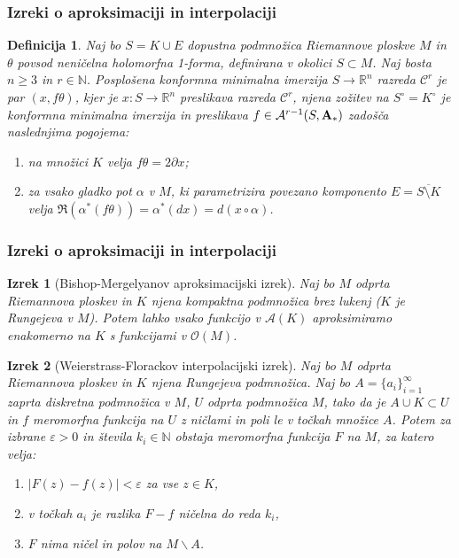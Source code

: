 \documentclass[9pt, table]{beamer}
\newtheorem{izrek}{Izrek}
\newtheorem{definicija}{Definicija}
\newcommand{\R}{\mathbb R}
\newcommand{\N}{\mathbb N}
\begin{document}

\begin{frame}
\frametitle{Izreki o aproksimaciji in interpolaciji}

\begin{definicija}
Naj bo $S = K \cup E$ dopustna podmnožica Riemannove ploskve $M$ in $\theta$ povsod neničelna holomorfna 1-forma, definirana v okolici $S \subset M$.
Naj bosta $n \geq 3$ in $r \in \N$. \textup{Posplošena konformna minimalna imerzija} $S \to \R^{n}$ razreda $\mathcal{C}^{r}$ je par $(x, f \theta)$, kjer je $x \colon S \to \R^{n}$ preslikava razreda  $\mathcal{C}^{r}$, njena zožitev na $S^\circ = K^\circ$ je konformna minimalna imerzija in preslikava $f \in \mathcal{A}^{r-1}(S, \textbf{\textup{A}}_{*})$ zadošča naslednjima pogojema:
\begin{enumerate}
\item na množici $K$ velja $f \theta = 2 \partial x$;
\item za vsako gladko pot $\alpha$ v $M$, ki parametrizira povezano komponento $E = \overline{S \setminus K}$ velja $ \Re(\alpha^{*}(f \theta)) = \alpha^{*}(dx) = d(x \circ \alpha)$.
\end{enumerate}
\end{definicija}

\end{frame}


\begin{frame}
\frametitle{Izreki o aproksimaciji in interpolaciji}
 
\begin{izrek} [Bishop-Mergelyanov aproksimacijski izrek] \label{izr:Bishop-Mergelyan}
Naj bo $M$ odprta Riemannova ploskev in $K$ njena kompaktna podmnožica brez lukenj ($K$ je Rungejeva v $M$). Potem lahko vsako funkcijo v $\mathcal{A}(K)$ aproksimiramo enakomerno na $K$ s funkcijami v $\mathcal{O}(M)$.
\end{izrek}

\begin{izrek} [Weierstrass-Florackov interpolacijski izrek]
Naj bo $M$ odprta Riemannova ploskev in $K$ njena Rungejeva podmnožica. Naj bo $A = \{ a_i \}_{i=1}^{\infty}$ zaprta diskretna podmnožica v $M$, $U$ odprta podmnožica $M$, tako da je $A \cup K \subset U$ in $f$ meromorfna funkcija na $U$ z ničlami in poli le v točkah množice $A$.
Potem za izbrane $\varepsilon > 0$ in števila $k_{i} \in \N$ obstaja meromorfna funkcija $F$ na $M$, za katero velja:
\begin{enumerate}
\item $|F(z) - f(z)| < \varepsilon$ za vse $z \in K$,
\item v točkah $a_i$ je razlika $F-f$ ničelna do reda $k_i$,
\item $F$ nima ničel in polov na $M \backslash A$.
\end{enumerate} 
\end{izrek}

\end{frame}
\end{document}
